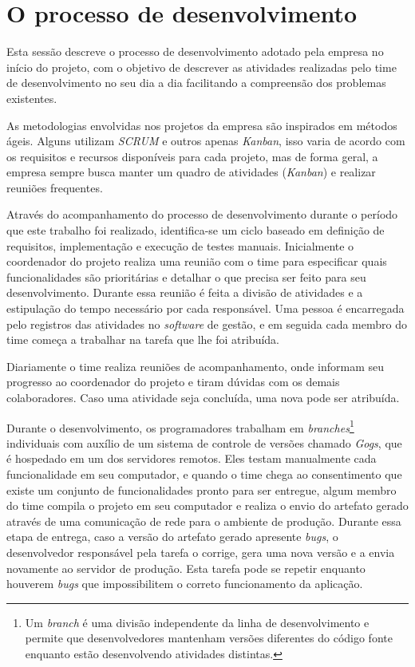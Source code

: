 \documentclass[
	12pt,				%
	openright,			%
	oneside,			%
	a4paper,			%
	english,			%
	french,				%
	spanish,			%
	brazil,				%
	]{abntex2}
\begin{document}
\section{O processo de desenvolvimento} 

Esta sessão descreve o processo de desenvolvimento adotado pela empresa no início do projeto, com o objetivo de descrever as atividades realizadas pelo time de desenvolvimento no seu dia a dia facilitando a compreensão dos problemas existentes.

As metodologias envolvidas nos projetos da empresa são inspirados em métodos ágeis. Alguns utilizam \textit{SCRUM} e outros apenas \textit{Kanban}, isso varia de acordo com os requisitos e recursos disponíveis para cada projeto, mas de forma geral, a empresa sempre busca manter um quadro de atividades (\textit{Kanban}) e realizar reuniões frequentes.

Através do acompanhamento do processo de desenvolvimento durante o período que este trabalho foi realizado, identifica-se um ciclo baseado em definição de requisitos, implementação e execução de testes manuais. Inicialmente o coordenador do projeto realiza uma reunião com o time para especificar quais funcionalidades são prioritárias e detalhar o que precisa ser feito para seu desenvolvimento. Durante essa reunião é feita a divisão de atividades e a estipulação do tempo necessário por cada responsável. Uma pessoa é encarregada pelo registros das atividades no \textit{software} de gestão, e em seguida cada membro do time começa a trabalhar na tarefa que lhe foi atribuída.

Diariamente o time realiza reuniões de acompanhamento, onde informam seu progresso ao coordenador do projeto e tiram dúvidas com os demais colaboradores. Caso uma atividade seja concluída, uma nova pode ser atribuída.

Durante o desenvolvimento, os programadores trabalham em \textit{branches}\footnote{Um \textit{branch} é uma divisão independente da linha de desenvolvimento e permite que desenvolvedores mantenham versões diferentes do código fonte enquanto estão desenvolvendo atividades distintas.} individuais com auxílio de um sistema de controle de versões chamado \textit{Gogs}, que é hospedado em um dos servidores remotos. Eles testam manualmente cada funcionalidade em seu computador, e quando o time chega ao consentimento que existe um conjunto de funcionalidades pronto para ser entregue, algum membro do time compila o projeto em seu computador e realiza o envio do artefato gerado através de uma comunicação de rede para o ambiente de produção. Durante essa etapa de entrega, caso a versão do artefato gerado apresente \textit{bugs}, o desenvolvedor responsável pela tarefa o corrige, gera uma nova versão e a envia novamente ao servidor de produção. Esta tarefa pode se repetir enquanto houverem \textit{bugs} que impossibilitem o correto funcionamento da aplicação.
\end{document}

